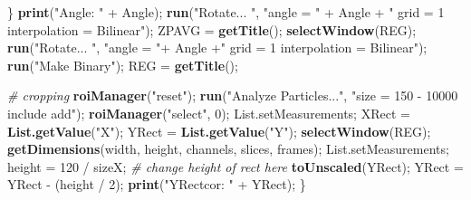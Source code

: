 \documentclass[11pt,singlespacinge,twoside]{reedthesis} %
\newenvironment{Shaded}{}{}
\newcommand{\CommentTok}[1]{\textit{#1}}
\newcommand{\DecValTok}[1]{#1}
\newcommand{\KeywordTok}[1]{\textbf{#1}}
\newcommand{\NormalTok}[1]{#1}
\newcommand{\OperatorTok}[1]{#1}
\newcommand{\StringTok}[1]{#1}
\theoremstyle{definition}
\theoremstyle{definition}
\theoremstyle{definition}
\theoremstyle{remark}
\begin{document}
\begin{Shaded}
\begin{Highlighting}[numbers=left,,]
\NormalTok{            \}}
            \KeywordTok{print}\NormalTok{(}\StringTok{"Angle: "} \OperatorTok{+}\StringTok{ }\NormalTok{Angle);}
            \KeywordTok{run}\NormalTok{(}\StringTok{"Rotate... "}\NormalTok{, }
                \StringTok{"angle = "} \OperatorTok{+}\StringTok{ }\NormalTok{Angle }\OperatorTok{+}\StringTok{ " grid = 1 interpolation = Bilinear"}\NormalTok{);}
\NormalTok{            ZPAVG =}\StringTok{ }\KeywordTok{getTitle}\NormalTok{();}
            \KeywordTok{selectWindow}\NormalTok{(REG);}
            \KeywordTok{run}\NormalTok{(}\StringTok{"Rotate... "}\NormalTok{, }
                \StringTok{"angle = "}\OperatorTok{+}\StringTok{ }\NormalTok{Angle }\OperatorTok{+}\StringTok{" grid = 1 interpolation = Bilinear"}\NormalTok{);}
            \KeywordTok{run}\NormalTok{(}\StringTok{"Make Binary"}\NormalTok{);}
\NormalTok{            REG =}\StringTok{ }\KeywordTok{getTitle}\NormalTok{();}
        
        \CommentTok{# cropping}
            \KeywordTok{roiManager}\NormalTok{(}\StringTok{"reset"}\NormalTok{);}
            \KeywordTok{run}\NormalTok{(}\StringTok{"Analyze Particles..."}\NormalTok{, }
                \StringTok{"size = 150 - 10000 include add"}\NormalTok{);}
            \KeywordTok{roiManager}\NormalTok{(}\StringTok{"select"}\NormalTok{, }\DecValTok{0}\NormalTok{);}
\NormalTok{            List.setMeasurements;}
\NormalTok{            XRect =}\StringTok{ }\KeywordTok{List.getValue}\NormalTok{(}\StringTok{"X"}\NormalTok{);}
\NormalTok{            YRect =}\StringTok{ }\KeywordTok{List.getValue}\NormalTok{(}\StringTok{"Y"}\NormalTok{);}
            \KeywordTok{selectWindow}\NormalTok{(REG);}
            \KeywordTok{getDimensions}\NormalTok{(width, height, channels, slices, frames);}
\NormalTok{            List.setMeasurements;}
\NormalTok{            height =}\StringTok{ }\DecValTok{120} \OperatorTok{/}\StringTok{ }\NormalTok{sizeX; }\CommentTok{# change height of rect here}
            \KeywordTok{toUnscaled}\NormalTok{(YRect);}
\NormalTok{            YRect =}\StringTok{ }\NormalTok{YRect }\OperatorTok{-}\StringTok{ }\NormalTok{(height }\OperatorTok{/}\StringTok{ }\DecValTok{2}\NormalTok{);}
            \KeywordTok{print}\NormalTok{(}\StringTok{"YRectcor: "} \OperatorTok{+}\StringTok{ }\NormalTok{YRect);}
\NormalTok{        \} }


\end{Highlighting}
\end{Shaded}
\end{document}
